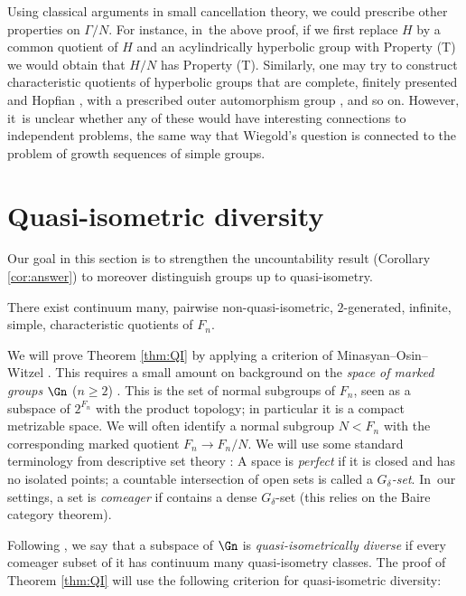 \begin{remark}
\label{rem:T}
Using classical arguments in small cancellation theory, we could prescribe other properties on $\Gamma/N$.
For instance, in~the above proof, if we first replace $H$ by a common quotient of $H$ and an acylindrically hyperbolic group with Property (T) \cite[Cor.\,1.6]{hull} we would obtain that $H/N$ has Property (T).
Similarly, one may try to construct characteristic quotients of hyperbolic groups that are complete, finitely presented and Hopfian \cite[Th.\,10.4]{Lyndon:2001wm}, with a prescribed outer automorphism group \cite{rips:out}, and so on.
However, it~is unclear whether any of these would have interesting connections to independent problems, the same way that Wiegold's question \cite[Quest.\,6.45]{kourovka} is connected to the problem of growth sequences of simple groups.
\end{remark}

\section{Quasi-isometric diversity}
\label{s:QI}

Our goal in this section is to strengthen the uncountability result (Corollary \ref{cor:answer}) to moreover distinguish groups up to quasi-isometry.

\begin{theorem}
\label{thm:QI}
There exist continuum many, pairwise non-quasi-isometric, $2$\nobreakdash-gen\-erated, infinite, simple, characteristic quotients of $F_n$.
\end{theorem}

We will prove Theorem \ref{thm:QI} by applying a criterion of Minasyan--Osin--Witzel \cite{diversity}. This requires a small amount on background on the \emph{space of marked groups} $\Gn$ ($n \geq 2$) \cite{grigorchuk}. This is the set of normal subgroups of $F_n$, seen as a subspace of $2^{F_n}$ with the product topology; in particular it is a compact metrizable space. We will often identify a normal subgroup $N < F_n$ with the corresponding marked quotient $F_n \to F_n / N$. We will use some standard terminology from descriptive set theory \cite[I.8]{kechris}: A space is \emph{perfect} if it is closed and has no isolated points; a countable intersection of open sets is called a \emph{$G_\delta$-set}. In~our settings, a set is \emph{comeager} if contains a dense $G_\delta$-set (this relies on the Baire category theorem).

Following \cite{diversity}, we say that a subspace of $\Gn$ is \emph{quasi-isometrically diverse} if every comeager subset of it has continuum many quasi-isometry classes.
The proof of Theorem \ref{thm:QI} will use the following criterion for quasi-isometric diversity:

